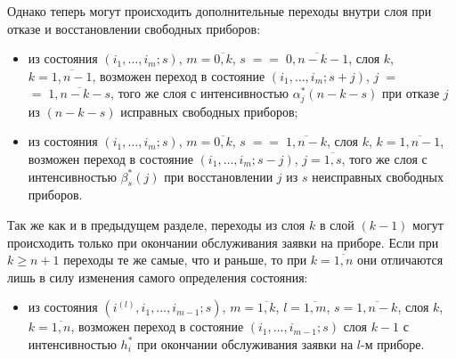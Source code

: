 \begin{multicols}{2}
Однако теперь могут происходить дополнительные переходы внутри
слоя при отказе и вос\-ста\-нов\-ле\-нии свободных приборов:
\begin{itemize}
\item из состояния $(i_1,\ldots,i_{m};s)$, $m=\overline{0,k}$,
$s\;=$\linebreak $=\;\overline{0,n-k-1}$,
слоя $k$, $k=\overline{1,n-1}$, возможен переход в состояние
$(i_1,\ldots,i_{m};s+j)$, $j\;=$\linebreak $=\;\overline{1,n-k-s}$, того же
слоя с интенсивностью $\alpha^*_j(n-k-s)$ при отказе $j$ из $(n-k-s)$
исправных свободных приборов;
\item
из состояния $(i_1,\ldots,i_{m};s)$, $m=\overline{0,k}$,
$s\;=$\linebreak $=\;\overline{1,n-k}$,
слоя $k$, $k=\overline{1,n-1}$, возможен переход в состояние
$(i_1,\ldots,i_{m};s-j)$, $j=\overline{1,s}$, того же слоя
с интенсивностью $\beta^*_s(j)$ при вос\-ста\-нов\-ле\-нии $j$ из $s$
неисправных свободных приборов.     %
\end{itemize}

Так же как и в предыдущем разделе, переходы из слоя $k$ в слой $(k-1)$
могут происходить только при окончании обслуживания заявки на
приборе. Если при $k\ge n+1$ переходы те же самые, что и
раньше, то при $k=\overline{1,n}$ они отличаются лишь в силу изменения
самого определения состояния:
\begin{itemize}
\item из состояния $(i^{(l)},i_1,\ldots,i_{m-1};s)$,
$m=\overline{1,k}$, $l=\overline{1,m}$, $s=\overline{1,n-k}$,
слоя $k$, $k=\overline{1,n}$, возможен переход в состояние
$(i_1,\ldots,i_{m-1};s)$                 %
слоя $k-1$ с
интенсивностью $h_i^*$ при окончании обслуживания заявки на $l$-м
приборе.
\end{itemize}


\end{multicols}
